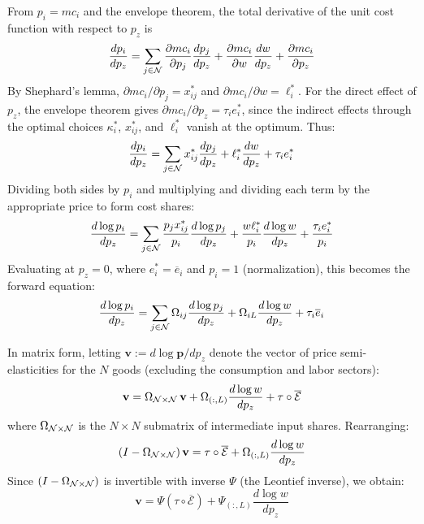 From $p_i = mc_i$ and the envelope theorem, the total derivative of the unit cost function with respect to $p_z$ is
\begin{equation*}
    \frac{dp_i}{dp_z} = \sum_{j \in \mathcal{N}} \frac{\partial mc_i}{\partial p_j}\frac{dp_j}{dp_z} + \frac{\partial mc_i}{\partial w}\frac{dw}{dp_z} + \frac{\partial mc_i}{\partial p_z}
\end{equation*}
By Shephard's lemma, $\partial mc_i / \partial p_j = x_{ij}^*$ and $\partial mc_i / \partial w = \ell_i^*$. For the direct effect of $p_z$, the envelope theorem gives $\partial mc_i / \partial p_z = \tau_i e_i^*$, since the indirect effects through the optimal choices $\kappa_i^*$, $x_{ij}^*$, and $\ell_i^*$ vanish at the optimum. Thus:
\begin{equation}
    \label{eq: total deriv p}
    \frac{dp_i}{dp_z} = \sum_{j \in \mathcal{N}} x_{ij}^* \frac{dp_j}{dp_z} + \ell_i^* \frac{dw}{dp_z} + \tau_i e_i^*
\end{equation}
Dividing both sides by $p_i$ and multiplying and dividing each term by the appropriate price to form cost shares:
\begin{equation*}
    \frac{d \log p_i}{dp_z} = \sum_{j \in \mathcal{N}} \frac{p_j x_{ij}^*}{p_i} \frac{d \log p_j}{dp_z} + \frac{w \ell_i^*}{p_i} \frac{d \log w}{dp_z} + \frac{\tau_i e_i^*}{p_i}
\end{equation*}
Evaluating at $p_z = 0$, where $e_i^* = \overline{e}_i$ and $p_i = 1$ (normalization), this becomes the forward equation:
\begin{equation}
    \label{eq: forward eq proof}
    \frac{d \log p_i}{dp_z} = \sum_{j \in \mathcal{N}} \Omega_{ij} \frac{d \log p_j}{dp_z} + \Omega_{iL} \frac{d \log w}{dp_z} + \tau_i \overline{e}_i
\end{equation}

In matrix form, letting $\mathbf{v} := d \log \mathbf{p} / dp_z$ denote the vector of price semi-elasticities for the $N$ goods (excluding the consumption and labor sectors):
\begin{equation*}
    \mathbf{v} = \Omega_{\mathcal{N} \times \mathcal{N}} \, \mathbf{v} + \Omega_{(:, L)} \frac{d \log w}{dp_z} + \tau \circ \overline{\mathcal{E}}
\end{equation*}
where $\Omega_{\mathcal{N} \times \mathcal{N}}$ is the $N \times N$ submatrix of intermediate input shares. Rearranging:
\begin{equation*}
    (I - \Omega_{\mathcal{N} \times \mathcal{N}}) \, \mathbf{v} = \tau \circ \overline{\mathcal{E}} + \Omega_{(:, L)} \frac{d \log w}{dp_z}
\end{equation*}
Since $(I - \Omega_{\mathcal{N} \times \mathcal{N}})$ is invertible with inverse $\Psi$ (the Leontief inverse), we obtain:
\begin{equation*}
    \mathbf{v} = \Psi (\tau \circ \overline{\mathcal{E}}) + \Psi_{(:,L)} \frac{d \log w}{dp_z}
\end{equation*}

